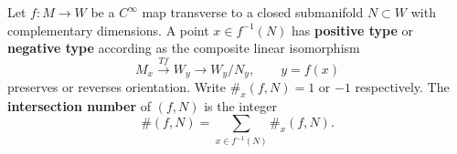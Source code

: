 Let $f \colon M \to W$ be a $C^{\infty}$ map transverse to a closed submanifold $N \subset W$ with complementary dimensions. A point $x \in f^{-1}(N)$ has \textbf{positive type} or \textbf{negative type} according as the composite linear isomorphism
$$
M_{x} \xrightarrow{Tf} W_{y} \to W_{y} / N_{y}, \qquad y = f(x)
$$
preserves or reverses orientation. Write $\#_{x}(f, N) = 1$ or $-1$ respectively. The \textbf{intersection number} of $(f, N)$ is the integer
$$
\#(f, N) = \sum_{x \in f^{-1}(N)} \#_{x}(f, N).
$$
